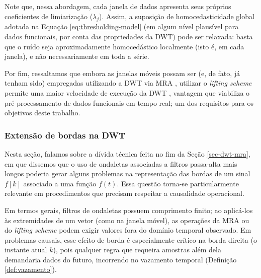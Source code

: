 Note que, nessa abordagem, cada janela de dados apresenta seus próprios coeficientes de limiarização (\(\lambda_j\)). 
Assim, a suposição de homocedasticidade global adotada na Equação \ref{eq:thresholding-model} (em algum nível plausível para dados funcionais, por conta das propriedades da DWT) pode ser relaxada: basta que o ruído seja aproximadamente homocedástico localmente (isto é, em cada janela), e não necessariamente em toda a série.

Por fim, ressaltamos que embora as janelas móveis possam ser (e, de fato, já tenham sido) empregadas utilizando a DWT via MRA \cite{xia_online_2007}, utilizar o \emph{lifting scheme} permite uma maior velocidade de execução da DWT \cite{liu_improved_2014}, vantagem que viabiliza o pré-processamento de dados funcionais em tempo real; um dos requisitos para os objetivos deste trabalho.

\subsubsection{Extensão de bordas na DWT}\label{sec-extensoes-borda}
Nesta seção, falamos sobre a dívida técnica feita no fim da Seção \ref{sec-dwt-mra}, em que dissemos que o uso de ondaletas associadas a filtros passa-alta mais longos poderia gerar alguns problemas na representação das bordas de um sinal \(f[k]\) associado a uma função \(f(t)\). Essa questão torna-se particularmente relevante em procedimentos que precisam respeitar a causalidade operacional.


Em termos gerais, filtros de ondaletas possuem comprimento finito; ao aplicá-los às extremidades de um vetor (como na janela móvel), as operações da MRA ou do \emph{lifting scheme} podem exigir valores fora do domínio temporal observado. 
Em problemas causais, esse efeito de borda é especialmente crítico na borda direita (o instante atual \(k\)), pois qualquer regra que requeira amostras além dela demandaria dados do futuro, incorrendo no vazamento temporal (Definição \ref{def:vazamento}).


